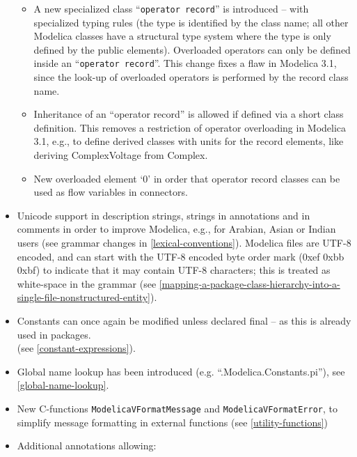 \begin{itemize}
  \begin{itemize}
  \item
    A new specialized class ``\lstinline!operator record!'' is introduced -- with
    specialized typing rules (the type is identified by the class name;
    all other Modelica classes have a structural type system where the
    type is only defined by the public elements). Overloaded operators
    can only be defined inside an ``\lstinline!operator record!''. This change fixes
    a flaw in Modelica 3.1, since the look-up of overloaded operators is
    performed by the record class name.
  \item
    Inheritance of an ``operator record'' is allowed if defined via a
    short class definition. This removes a restriction of operator
    overloading in Modelica 3.1, e.g., to define derived classes with
    units for the record elements, like deriving ComplexVoltage from
    Complex.
  \item
    New overloaded element `0' in order that operator record classes can
    be used as flow variables in connectors.
  \end{itemize}
\item
  Unicode support in description strings, strings in annotations and in
  comments in order to improve Modelica, e.g., for Arabian, Asian or
  Indian users (see grammar changes in \autoref{lexical-conventions}). Modelica files are
  UTF-8 encoded, and can start with the UTF-8 encoded byte order mark
  (0xef 0xbb 0xbf) to indicate that it may contain UTF-8 characters;
  this is treated as white-space in the grammar (see \autoref{mapping-a-package-class-hierarchy-into-a-single-file-nonstructured-entity}).
\item
  Constants can once again be modified unless declared final -- as this
  is already used in packages.\\
  (see \autoref{constant-expressions}).
\item
  Global name lookup has been introduced (e.g.
  ``.Modelica.Constants.pi''), see \autoref{global-name-lookup}.
\item
  New C-functions \lstinline!ModelicaVFormatMessage! and \lstinline!ModelicaVFormatError!, to
  simplify message formatting in external functions (see \autoref{utility-functions})
\item
  Additional annotations allowing:


\end{itemize}
